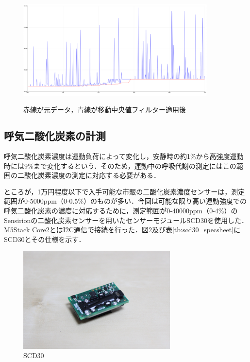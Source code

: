 \begin{figure}[H]
  \begin{center}
    \caption{赤線が元データ，青線が移動中央値フィルター適用後}
    \includegraphics[width=10cm]{fig/running_median_graph}
    \label{fig:running_median_graph}
  \end{center}
\end{figure}

\subsection{呼気二酸化炭素の計測}

呼気二酸化炭素濃度は運動負荷によって変化し，安静時の約1\%から高強度運動時には9\%まで変化するという\cite{co2_percent}．そのため，運動中の呼吸代謝の測定にはこの範囲の二酸化炭素濃度の測定に対応する必要がある．

ところが，1万円程度以下で入手可能な市販の二酸化炭素濃度センサーは，測定範囲が0-5000ppm（0-0.5\%）のものが多い．今回は可能な限り高い運動強度での呼気二酸化炭素の濃度に対応するために，測定範囲が0-40000ppm（0-4\%）のSensirionの二酸化炭素センサーを用いたセンサーモジュールSCD30を使用した．M5Stack Core2とはI2C通信で接続を行った．図\ref{fig:scd30}及び表\ref{tb:scd30_specsheet}にSCD30とその仕様を示す．

\begin{figure}[H]
  \begin{center}
    \includegraphics[width=8cm]{fig/scd30}
    \caption{SCD30}
    \label{fig:scd30}
  \end{center}
\end{figure}

